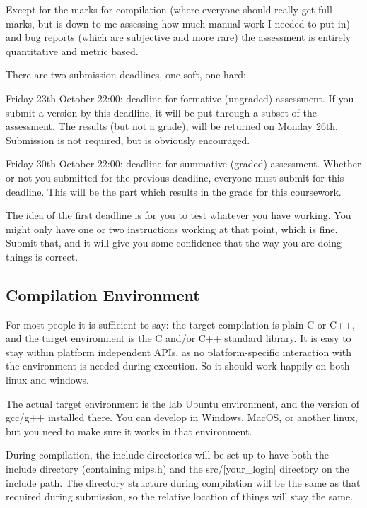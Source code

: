 Except for the marks for compilation (where everyone should really get full marks, but is down to me assessing how much manual work I needed to put in) and bug reports (which are subjective and more rare) the assessment is entirely quantitative and metric based.

There are two submission deadlines, one soft, one hard\+:


\begin{DoxyItemize}
\item Friday 23th October 22\+:00\+: deadline for formative (ungraded) assessment. If you submit a version by this deadline, it will be put through a subset of the assessment. The results (but not a grade), will be returned on Monday 26th. Submission is not required, but is obviously encouraged.
\item Friday 30th October 22\+:00\+: deadline for summative (graded) assessment. Whether or not you submitted for the previous deadline, everyone must submit for this deadline. This will be the part which results in the grade for this coursework.
\end{DoxyItemize}

The idea of the first deadline is for you to test whatever you have working. You might only have one or two instructions working at that point, which is fine. Submit that, and it will give you some confidence that the way you are doing things is correct.

\subsection*{Compilation Environment }

For most people it is sufficient to say\+: the target compilation is plain C or C++, and the target environment is the C and/or C++ standard library. It is easy to stay within platform independent A\+P\+Is, as no platform-\/specific interaction with the environment is needed during execution. So it should work happily on both linux and windows.

The actual target environment is the lab Ubuntu environment, and the version of gcc/g++ installed there. You can develop in Windows, Mac\+O\+S, or another linux, but you need to make sure it works in that environment.

During compilation, the include directories will be set up to have both the {\ttfamily include} directory (containing {\ttfamily mips.\+h}) and the {\ttfamily src/\mbox{[}your\+\_\+login\mbox{]}} directory on the include path. The directory structure during compilation will be the same as that required during submission, so the relative location of things will stay the same.


